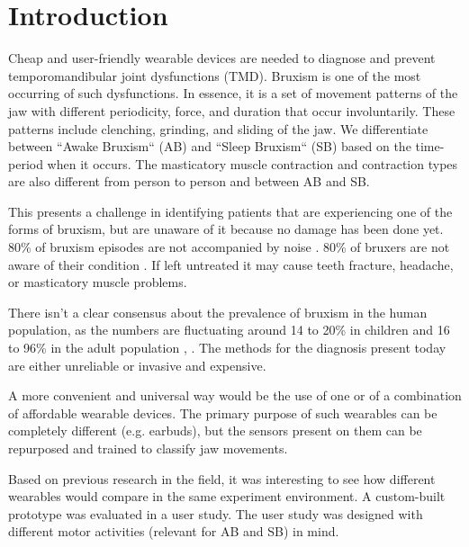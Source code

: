 \chapter{Introduction}
\label{ch:Introduction}

Cheap and user-friendly wearable devices are needed to diagnose and prevent temporomandibular joint dysfunctions (TMD). Bruxism is one of the most occurring of such dysfunctions. In essence, it is a set of movement patterns of the jaw with different periodicity, force, and duration that occur involuntarily. These patterns include clenching, grinding, and sliding of the jaw. We differentiate between ``Awake Bruxism`` (AB) and ``Sleep Bruxism`` (SB) based on the time-period when it occurs. The masticatory muscle contraction and contraction types are also different from person to person and between AB and SB.

This presents a challenge in identifying patients that are experiencing one of the forms of bruxism, but are unaware of it because no damage has been done yet. 80\% of bruxism episodes are not accompanied by noise \cite{shetty2010bruxism}. 80\% of bruxers are not aware of their condition \cite{thompson1994treatment}. If left untreated it may cause teeth fracture, headache, or masticatory muscle problems.

There isn't a clear consensus about the prevalence of bruxism in the human population, as the numbers are fluctuating around 14 to 20\% in children and 16 to 96\% in the adult population \cite{manfredini2013epidemiology}, \cite{thompson1994treatment}. The methods for the diagnosis present today are either unreliable or invasive and expensive.

A more convenient and universal way would be the use of one or of a combination of affordable wearable devices. The primary purpose of such wearables can be completely different (e.g. earbuds), but the sensors present on them can be repurposed and trained to classify jaw movements.

Based on previous research in the field, it was interesting to see how different wearables would compare in the same experiment environment. A custom-built prototype was evaluated in a user study. The user study was designed with different motor activities (relevant for AB and SB) in mind.